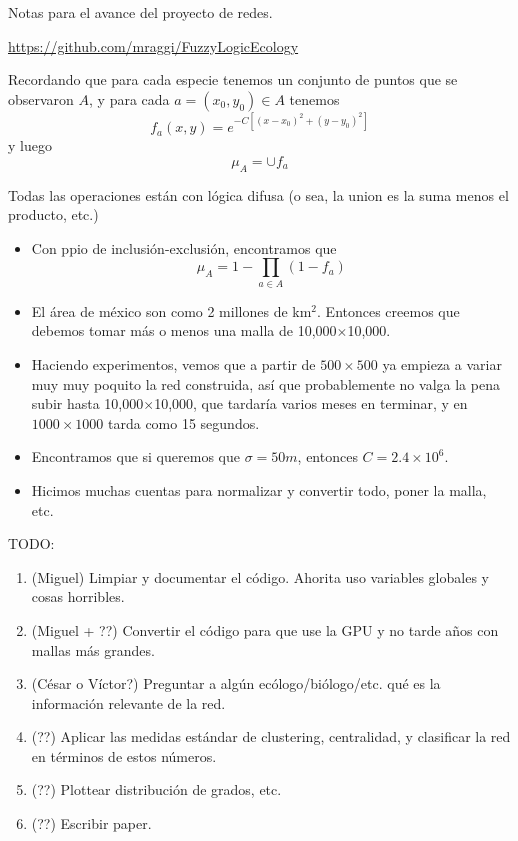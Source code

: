 \documentclass[a4paper,12pt]{article}
\begin{document}
	\begin{center}
	  Notas para el avance del proyecto de redes.
		
		\url{https://github.com/mraggi/FuzzyLogicEcology}
	\end{center}


  Recordando que para cada especie tenemos un conjunto de puntos que se observaron $A$, y para cada $a=(x_0,y_0)\in A$ tenemos
		$$f_a(x,y) = e^{-C\left[(x-x_0)^2 + (y-y_0)^2\right]}$$
  y luego
		$$\mu_A = \cup f_a$$
	
	Todas las operaciones están con lógica difusa (o sea, la union es la suma menos el producto, etc.)
	
	\begin{itemize}
	  \item Con ppio de inclusión-exclusión, encontramos que
			$$\mu_A = 1-\prod_{a\in A} (1-f_a)$$
		\item El área de méxico son como 2 millones de km$^2$. Entonces creemos que debemos tomar más o menos una malla de 10,000$\times$10,000.
		\item Haciendo experimentos, vemos que a partir de $500\times 500$ ya empieza a variar muy muy poquito la red construida, así que probablemente no valga la pena subir hasta 10,000$\times$10,000, que tardaría varios meses en terminar, y en $1000\times 1000$ tarda como 15 segundos.
		\item Encontramos que si queremos que $\sigma = 50m$, entonces $C = 2.4\times 10^6$.
		\item Hicimos muchas cuentas para normalizar y convertir todo, poner la malla, etc.
	\end{itemize}
	
	
	
	\vspace{1cm}
	TODO:
	
	\begin{enumerate}
		\item (Miguel) Limpiar y documentar el código. Ahorita uso variables globales y cosas horribles.
		\item (Miguel + ??) Convertir el código para que use la GPU y no tarde años con mallas más grandes.
		\item (César o Víctor?) Preguntar a algún ecólogo/biólogo/etc. qué es la información relevante de la red.
		\item (??) Aplicar las medidas estándar de clustering, centralidad, y clasificar la red en términos de estos números.
		\item (??) Plottear distribución de grados, etc.
		\item (??) Escribir paper.
	\end{enumerate}
\end{document}
